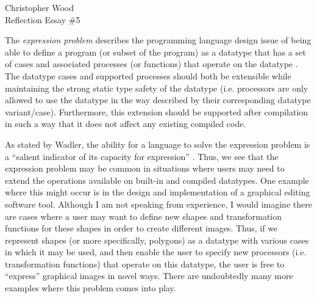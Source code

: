 \documentclass[12pt,letterpaper]{article}
\begin{document}
\begin{center}
Christopher Wood \\
Reflection Essay \#5 \\
\end{center}

\begin{comment}
What is the "expression problem"?
Can you suggest a realistic example of where one might encounter the expression problem is a software development project?
Is this a good "programming-languages problem"? That is, do you think that a programming language that has a "good" solution to the expression problem is "better" than a programming language that has a "bad" solution or no solution?
Can you suggest another "programming-languages problem"? That is, can you suggest a programming or software development task that you think would allow you to identify "good" (e.g., "powerful") languages from "bad" (e.g., "weak") languages.
\end{comment}

The \emph{expression problem} describes the programming language design issue of 
being able to define a program (or subset of the program) 
as a datatype that has a set of cases and associated processes (or functions) 
that operate on the datatype \cite{zenger2004independently}.
The datatype cases and supported processes should both be extensible while maintaining the strong
static type safety of the datatype (i.e. processors are only allowed to use the datatype in the way
described by their corresponding datatype variant/case). Furthermore, this extension should be 
supported after compilation in such a way that it does not affect any existing compiled code. 

As stated by Wadler, the ability for a language to solve the expression problem is a ``salient
indicator of its capacity for expression'' \cite{wadler1998expression}. Thus, we see that the expression problem 
may be common in situations where users may need to extend the operations available on built-in 
and compiled datatypes. One example where this might occur is in the design and implementation of a graphical 
editing software tool. Although I am not speaking from experience, I would imagine there are cases where
a user may want to define new shapes and transformation functions for these shapes in order to create
different images. Thus, if we represent shapes (or more specifically, polygons) as a datatype 
with various cases in which it may be used, and then enable the user to specify new processors (i.e.
transformation functions) that operate on this datatype, the user is free to ``express'' graphical
images in novel ways. There are undoubtedly many more examples where this problem comes into play. 
\end{document}
